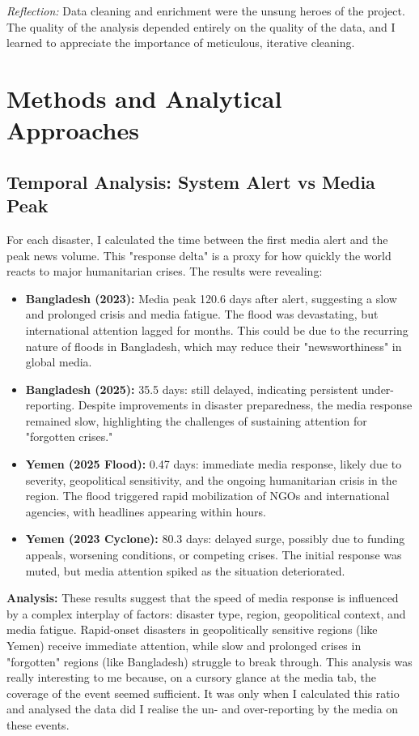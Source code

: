 \documentclass[12pt]{article}
\begin{document}
\textit{Reflection:} Data cleaning and enrichment were the unsung heroes of the project. The quality of the analysis depended entirely on the quality of the data, and I learned to appreciate the importance of meticulous, iterative cleaning.

\section{Methods and Analytical Approaches}
\subsection{Temporal Analysis: System Alert vs Media Peak}
For each disaster, I calculated the time between the first media alert and the peak news volume. This "response delta" is a proxy for how quickly the world reacts to major humanitarian crises. The results were revealing:
\begin{itemize}
    \item \textbf{Bangladesh (2023):} Media peak 120.6 days after alert, suggesting a slow and prolonged crisis and media fatigue. The flood was devastating, but international attention lagged for months. This could be due to the recurring nature of floods in Bangladesh, which may reduce their "newsworthiness" in global media.
    \item \textbf{Bangladesh (2025):} 35.5 days: still delayed, indicating persistent under-reporting. Despite improvements in disaster preparedness, the media response remained slow, highlighting the challenges of sustaining attention for "forgotten crises."
    \item \textbf{Yemen (2025 Flood):} 0.47 days: immediate media response, likely due to severity, geopolitical sensitivity, and the ongoing humanitarian crisis in the region. The flood triggered rapid mobilization of NGOs and international agencies, with headlines appearing within hours.
    \item \textbf{Yemen (2023 Cyclone):} 80.3 days: delayed surge, possibly due to funding appeals, worsening conditions, or competing crises. The initial response was muted, but media attention spiked as the situation deteriorated.
\end{itemize}

\textbf{Analysis:} These results suggest that the speed of media response is influenced by a complex interplay of factors: disaster type, region, geopolitical context, and media fatigue. Rapid-onset disasters in geopolitically sensitive regions (like Yemen) receive immediate attention, while slow and prolonged crises in "forgotten" regions (like Bangladesh) struggle to break through. This analysis was really interesting to me because, on a cursory glance at the media tab, the coverage of the event seemed sufficient. It was only when I calculated this ratio and analysed the data did I realise the un- and over-reporting by the media on these events.
\end{document}
